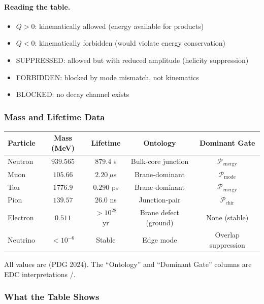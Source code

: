 \paragraph{Reading the table.}
\begin{itemize}[nosep]
  \item $Q > 0$: kinematically allowed (energy available for products)
  \item $Q < 0$: kinematically forbidden (would violate energy conservation)
  \item SUPPRESSED: allowed but with reduced amplitude (helicity suppression)
  \item FORBIDDEN: blocked by mode mismatch, not kinematics
  \item BLOCKED: no decay channel exists
\end{itemize}

\subsubsection{Mass and Lifetime Data}

\begin{center}
\begin{tabular}{lcccc}
\toprule
\textbf{Particle} & \textbf{Mass (MeV)} & \textbf{Lifetime} &
\textbf{Ontology} & \textbf{Dominant Gate} \\
\midrule
Neutron & $939.565$ & $879.4$ s & Bulk-core junction &
$\mathcal{P}_{\text{energy}}$ \\
Muon & $105.66$ & $2.20~\mu$s & Brane-dominant &
$\mathcal{P}_{\text{mode}}$ \\
Tau & $1776.9$ & $0.290$ ps & Brane-dominant &
$\mathcal{P}_{\text{energy}}$ \\
Pion & $139.57$ & $26.0$ ns & Junction-pair &
$\mathcal{P}_{\text{chir}}$ \\
Electron & $0.511$ & $> 10^{28}$ yr & Brane defect (ground) &
None (stable) \\
Neutrino & $< 10^{-6}$ & Stable & Edge mode &
Overlap suppression \\
\bottomrule
\end{tabular}
\end{center}

All values are \tagBL{} (PDG 2024). The ``Ontology'' and ``Dominant Gate'' columns
are EDC interpretations \tagP{}/\tagDc{}.

\subsubsection{What the Table Shows}

